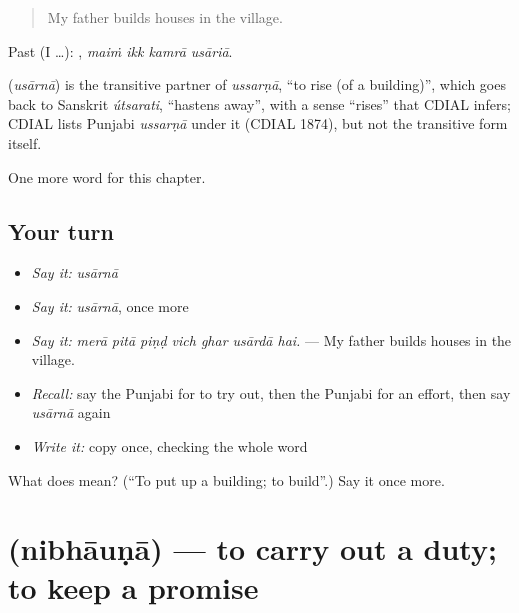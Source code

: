 \begin{quote}
My father builds houses in the village.
\end{quote}

Past (I …):    , \emph{maiṁ ikk kamrā usāriā}.

\begin{cousinweb}
\textbf{} (\emph{usārnā}) is the transitive partner of \emph{ussarṇā}, \textquotedblleft{}to rise (of a building)\textquotedblright{}, which goes back to Sanskrit \emph{útsarati}, \textquotedblleft{}hastens away\textquotedblright{}, with a sense \textquotedblleft{}rises\textquotedblright{} that CDIAL infers; CDIAL lists Punjabi \emph{ussarṇā} under it (CDIAL 1874), but not the transitive form itself.
\end{cousinweb}

\begin{grammarlens}[title={What you've built}]
One more word for this chapter.
\end{grammarlens}

\subsection*{Your turn}
\begin{itemize}
\raggedright
  \item \emph{Say it:} \emph{usārnā}
  \item \emph{Say it:} \emph{usārnā}, once more
  \item \emph{Say it:} \emph{merā pitā piṇḍ vich ghar usārdā hai.} — My father builds houses in the village.
  \item \emph{Recall:} say the Punjabi for to try out, then the Punjabi for an effort, then say \emph{usārnā} again
  \item \emph{Write it:} copy \textbf{} once, checking the whole word
\end{itemize}

\begin{tcolorbox}[breakable,colback=teal!4,colframe=teal!35!black,title={Before you move on}]
What does  mean? (\textquotedblleft{}To put up a building; to build\textquotedblright{}.) Say it once more.
\end{tcolorbox}
\section[\texorpdfstring{\pa{ਨਿਭਾਉਣਾ} (nibhāuṇā)}{ਨਿਭਾਉਣਾ (nibhāuṇā)}]{ (nibhāuṇā) — to carry out a duty; to keep a promise}

